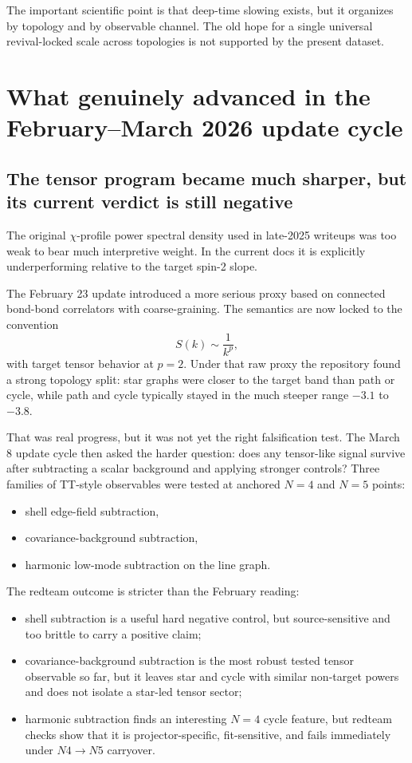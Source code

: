 \documentclass[11pt]{article}
\begin{document}
The important scientific point is that deep-time slowing exists, but it organizes by topology and by observable channel. The old hope for a single universal revival-locked scale across topologies is not supported by the present dataset.

\section{What genuinely advanced in the February--March 2026 update cycle}

\subsection{The tensor program became much sharper, but its current verdict is still negative}

The original $\chi$-profile power spectral density used in late-2025 writeups was too weak to bear much interpretive weight. In the current docs it is explicitly underperforming relative to the target spin-2 slope.

The February 23 update introduced a more serious proxy based on connected bond-bond correlators with coarse-graining. The semantics are now locked to the convention
\[
S(k) \sim \frac{1}{k^p},
\]
with target tensor behavior at $p=2$. Under that raw proxy the repository found a strong topology split: star graphs were closer to the target band than path or cycle, while path and cycle typically stayed in the much steeper range $-3.1$ to $-3.8$.

That was real progress, but it was not yet the right falsification test. The March 8 update cycle then asked the harder question: does any tensor-like signal survive after subtracting a scalar background and applying stronger controls? Three families of TT-style observables were tested at anchored $N=4$ and $N=5$ points:
\begin{itemize}
    \item shell edge-field subtraction,
    \item covariance-background subtraction,
    \item harmonic low-mode subtraction on the line graph.
\end{itemize}

The redteam outcome is stricter than the February reading:
\begin{itemize}
    \item shell subtraction is a useful hard negative control, but source-sensitive and too brittle to carry a positive claim;
    \item covariance-background subtraction is the most robust tested tensor observable so far, but it leaves star and cycle with similar non-target powers and does not isolate a star-led tensor sector;
    \item harmonic subtraction finds an interesting $N=4$ cycle feature, but redteam checks show that it is projector-specific, fit-sensitive, and fails immediately under $N4 \rightarrow N5$ carryover.
\end{itemize}
\end{document}
